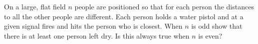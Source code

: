 On a large, flat field $n$ people are positioned so that for each person the distances to all the other people are different.  Each person holds a water pistol and at a given signal fires and hits the person who is closest.  When $n$ is odd show that there is at least one person left dry.  Is this always true when $n$ is even?